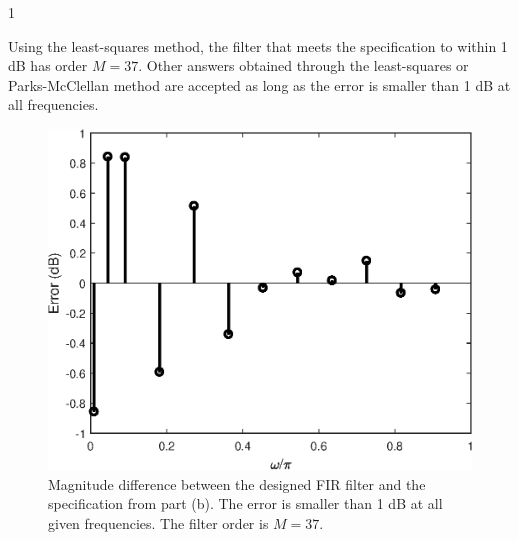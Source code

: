 \documentclass[10pt]{article}
\def\SOLUTIONS{1} %
\def\SolutionsColor{red2}
\begin{document}
\begin{description}
	\if\SOLUTIONS1
	{\color{\SolutionsColor} Using the least-squares method, the filter that meets the specification to within 1 dB has order $M = 37$. Other answers obtained through the least-squares or Parks-McClellan method are accepted as long as the error is smaller than 1 dB at all frequencies.
		
	\FloatBarrier
	\begin{figure}[h!]
		\centering
		\includegraphics[scale=0.6]{figs/hearing_aid_filter_error.eps}
		\caption{Magnitude difference between the designed FIR filter and the specification from part (b). The error is smaller than 1 dB at all given frequencies. The filter order is $M = 37$.}
	\end{figure}
	\FloatBarrier	
	
}
\end{description}
\end{document}
